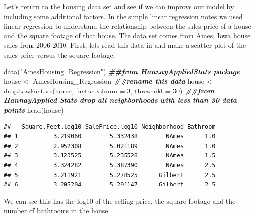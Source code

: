 \documentclass[
]{book}
\newenvironment{Shaded}{\begin{snugshade}}{\end{snugshade}}
\newcommand{\AttributeTok}[1]{\textcolor[rgb]{0.77,0.63,0.00}{#1}}
\newcommand{\DecValTok}[1]{\textcolor[rgb]{0.00,0.00,0.81}{#1}}
\newcommand{\DocumentationTok}[1]{\textcolor[rgb]{0.56,0.35,0.01}{\textbf{\textit{#1}}}}
\newcommand{\FloatTok}[1]{\textcolor[rgb]{0.00,0.00,0.81}{#1}}
\newcommand{\FunctionTok}[1]{\textcolor[rgb]{0.00,0.00,0.00}{#1}}
\newcommand{\NormalTok}[1]{#1}
\newcommand{\OtherTok}[1]{\textcolor[rgb]{0.56,0.35,0.01}{#1}}
\newcommand{\SpecialCharTok}[1]{\textcolor[rgb]{0.00,0.00,0.00}{#1}}
\newcommand{\StringTok}[1]{\textcolor[rgb]{0.31,0.60,0.02}{#1}}
\theoremstyle{definition}
\theoremstyle{definition}
\theoremstyle{definition}
\theoremstyle{definition}
\theoremstyle{remark}
\begin{document}
Let's return to the housing data set and see if we can improve our model by including some additional factors. In the simple linear regression notes we used linear regression to understand the relationship between the sales price of a house and the square footage of that house. The data set comes from Ames, Iowa house sales from 2006-2010. First, lets read this data in and make a scatter plot of the sales price versus the square footage.

\begin{Shaded}
\begin{Highlighting}[]
\FunctionTok{data}\NormalTok{(}\StringTok{"AmesHousing\_Regression"}\NormalTok{)  }\DocumentationTok{\#\#from HannayAppliedStats package}
\NormalTok{house }\OtherTok{\textless{}{-}}\NormalTok{ AmesHousing\_Regression  }\DocumentationTok{\#\#rename this data}
\NormalTok{house }\OtherTok{\textless{}{-}} \FunctionTok{dropLowFactors}\NormalTok{(house, }\AttributeTok{factor.column =} \DecValTok{3}\NormalTok{, }\AttributeTok{threshold =} \DecValTok{30}\NormalTok{)  }\DocumentationTok{\#\#from HannayApplied Stats drop all neighborhoods with less than 30 data points}
\FunctionTok{head}\NormalTok{(house)}
\end{Highlighting}
\end{Shaded}

\begin{verbatim}
##   Square.Feet.log10 SalePrice.log10 Neighborhood Bathroom
## 1          3.219060        5.332438        NAmes      1.0
## 2          2.952308        5.021189        NAmes      1.0
## 3          3.123525        5.235528        NAmes      1.5
## 4          3.324282        5.387390        NAmes      2.5
## 5          3.211921        5.278525      Gilbert      2.5
## 6          3.205204        5.291147      Gilbert      2.5
\end{verbatim}

We can see this has the log10 of the selling price, the square footage and the number of bathrooms in the house.

\begin{Shaded}
\end{Shaded}
\end{document}
